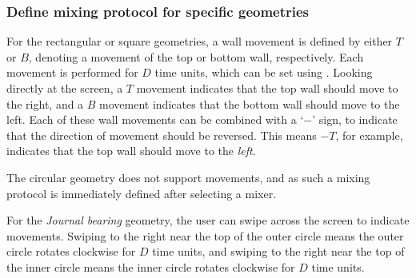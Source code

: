 

\subsubsection{Define mixing protocol for specific geometries}
For the rectangular or square geometries, a wall movement is defined by either $T$ or $B$, denoting a movement of the top or bottom wall, respectively. Each movement is performed for $D$ time units, which can be set using . Looking directly at the screen, a $T$ movement indicates that the top wall should move to the right, and a $B$ movement indicates that the bottom wall should move to the left. Each of these wall movements can be combined with a `$-$' sign, to indicate that the direction of movement should be reversed. This means $-T$, for example, indicates that the top wall should move to the \emph{left}.

The circular geometry does not support movements, and as such a mixing protocol is immediately defined after selecting a mixer.

For the \emph{Journal bearing} geometry, the user can swipe across the screen to indicate movements. Swiping to the right near the top of the outer circle means the outer circle rotates clockwise for $D$ time units, and swiping to the right near the top of the inner circle means the inner circle rotates clockwise for $D$ time units.


